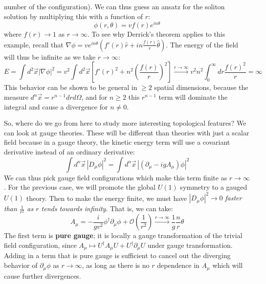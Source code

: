 \documentclass[11pt, oneside]{article}   	%
\theoremstyle{definition}
\begin{document}
number of the configuration). We can thus guess an ansatz for the soliton solution by multiplying this with a function of $r$:
\begin{equation}
	\phi(r, \theta) = v f(r) e^{in\theta}
\end{equation}
where $f(r)\rightarrow 1$ as $r\rightarrow\infty$. To see why Derrick's theorem applies to this example, recall that $\nabla\phi = ve^{in\theta} (f'(r)\hat r + in\frac{f(r)}{r}\hat\theta)$. 
The energy of the field will thus be infinite as we take $r\rightarrow\infty$:
\begin{equation}
	E = \int d^2 \vec x |\nabla\phi|^2 = v^2 \int d^2 \vec x \left[ f'(r)^2 + n^2 \left(\frac{f(r)}{r}\right)^2\right]\xrightarrow{r\rightarrow\infty} v^2 n^2 \int_0^\infty dr\frac{f(r)^2}{r} = \infty
\end{equation}
This behavior can be shown to be general in $\geq 2$ spatial dimensions, because the measure $d^n\vec x = r^{n - 1} dr d\Omega$, 
and for $n \geq 2$ this $r^{n - 1}$ term will dominate the integral and cause a divergence for $n\neq 0$. 

So, where do we go from here to study more interesting topological features? We can look at gauge theories. These will be different than 
theories with just a scalar field because in a gauge theory, the kinetic energy term will use a covariant derivative instead of an 
ordinary derivative:
\begin{equation}
	\int d^n\vec x \, |D_\mu\phi|^2 = \int d^n\vec x \,|(\partial_\mu - ig A_\mu)\phi |^2
\end{equation}
We can thus pick gauge field configurations which make this term finite as $r\rightarrow\infty$. For the previous case, we will promote the 
global $U(1)$ symmetry to a gauged $U(1)$ theory. Then to make the energy finite, we must have $|D_\mu \phi|^2\rightarrow 0$ \textit{faster than 
$\frac{1}{r^2}$ as $r$ tends towards infinity}. That is, we can take:
\begin{equation}
	A_\mu = -\frac{i}{gv^2}\phi^\dagger \partial_\mu\phi + \mathcal O\left(\frac{1}{r^2}\right)\xrightarrow{r\rightarrow\infty} \frac{1}{g}\frac{n}{r}\hat\theta
\end{equation}
The first term is \textbf{pure gauge}; it is locally a gauge transformation of the trivial field configuration, since $A_\mu\mapsto U^\dagger A_\mu U + U^\dagger 
\partial_\mu U$ under gauge transformation. Adding in a term that is pure gauge is sufficient to cancel out the diverging behavior of $\partial_\mu\phi$ as 
$r\rightarrow\infty$, as long as there is no $r$ dependence in $A_\mu$ which will cause further divergences. 
\end{document}
